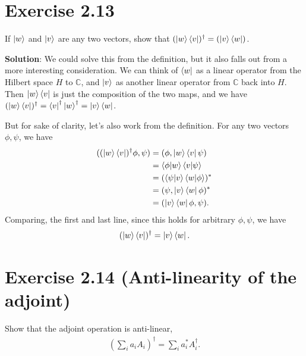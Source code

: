 \documentclass{book}
\begin{document}
\section*{Exercise 2.13}
    If $\ket{w}$ and $\ket{v}$ are any two vectors, show that $(\ket{w}\bra{v})^\dagger = (\ket{v}\bra{w})$.
    
    \textbf{Solution}: We could solve this from the definition, but it also falls out from a more interesting consideration. We can think of $\bra{w}$ as a linear operator from the Hilbert space $H$ to $\mathbb{C}$, and $\ket{v}$ as another linear operator from $\mathbb{C}$ back into $H$. Then $\ket{w}\bra{v}$ is just the composition of the two maps, and we have $(\ket{w}\bra{v})^\dagger = \bra{v}^\dagger \ket{w}^
    \dagger = \ket{v}\bra{w}$. 
    
    But for sake of clarity, let's also work from the definition. For any two vectors $\phi, \psi$, we have
    \begin{align}
    \begin{aligned}
        ((\ket{w}\bra{v})^\dagger \phi,  \psi) &=(\phi, \ket{w}\bra{v} \psi) \\ 
        &= \bra{\phi}\ket{w}\bra{v}\ket{\psi} \\
        &=(\bra{\psi}\ket{v}\bra{w}\ket{\phi})^* \\
        &= (\psi, \ket{v}\bra{w} \phi)^* \\
        &= (\ket{v}\bra{w} \phi, \psi).
    \end{aligned}
    \end{align}
    Comparing, the first and last line, since this holds for arbitrary $\phi, \psi$, we have 
    \begin{align}
        (\ket{w}\bra{v})^\dagger = \ket{v}\bra{w}.
    \end{align}
    
\section*{Exercise 2.14 (Anti-linearity of the adjoint)}
    Show that the adjoint operation is anti-linear,
    \begin{align}
        \left(\sum_i a_i A_i\right)^\dagger = \sum_i a_i^* A_i^\dagger.
    \end{align}
    
\end{document}
